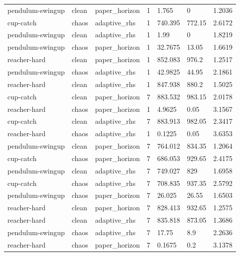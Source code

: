 \begin{tabular}{lllllll}
pendulum-swingup & clean & paper\_horizon & 1 & 1.765 & 0 & 1.2036 \\
cup-catch & chaos & adaptive\_rhs & 1 & 740.395 & 772.15 & 2.6172 \\
pendulum-swingup & clean & adaptive\_rhs & 1 & 1.99 & 0 & 1.8219 \\
pendulum-swingup & chaos & paper\_horizon & 1 & 32.7675 & 13.05 & 1.6619 \\
reacher-hard & clean & paper\_horizon & 1 & 852.083 & 976.2 & 1.2517 \\
pendulum-swingup & chaos & adaptive\_rhs & 1 & 42.9825 & 44.95 & 2.1861 \\
reacher-hard & clean & adaptive\_rhs & 1 & 847.938 & 880.2 & 1.5025 \\
cup-catch & clean & paper\_horizon & 7 & 883.532 & 983.15 & 2.0178 \\
reacher-hard & chaos & paper\_horizon & 1 & 4.9625 & 0.05 & 3.1567 \\
cup-catch & clean & adaptive\_rhs & 7 & 883.913 & 982.05 & 2.3417 \\
reacher-hard & chaos & adaptive\_rhs & 1 & 0.1225 & 0.05 & 3.6353 \\
pendulum-swingup & clean & paper\_horizon & 7 & 764.012 & 834.35 & 1.2064 \\
cup-catch & chaos & paper\_horizon & 7 & 686.053 & 929.65 & 2.4175 \\
pendulum-swingup & clean & adaptive\_rhs & 7 & 749.027 & 829 & 1.6958 \\
cup-catch & chaos & adaptive\_rhs & 7 & 708.835 & 937.35 & 2.5792 \\
pendulum-swingup & chaos & paper\_horizon & 7 & 26.025 & 26.55 & 1.6503 \\
reacher-hard & clean & paper\_horizon & 7 & 828.413 & 932.65 & 1.2575 \\
reacher-hard & clean & adaptive\_rhs & 7 & 835.818 & 873.05 & 1.3686 \\
pendulum-swingup & chaos & adaptive\_rhs & 7 & 17.75 & 8.9 & 2.2636 \\
reacher-hard & chaos & paper\_horizon & 7 & 0.1675 & 0.2 & 3.1378 \\
\bottomrule
\end{tabular}
